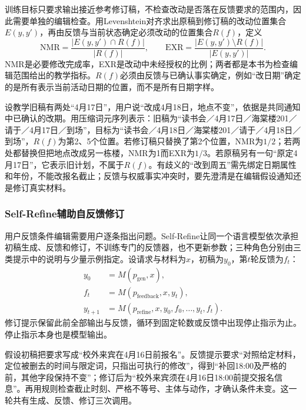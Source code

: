 训练目标只要求输出接近参考修订稿，不检查改动是否落在反馈要求的范围内，因此需要单独的编辑检查。用Levenshtein对齐求出原稿到修订稿的改动位置集合$E(y,y')$，再由反馈与当前状态确定必须改动的位置集合$R(f)$，定义
\begin{equation}
 \mathrm{NMR}=\frac{\lvert E(y,y')\cap R(f)\rvert}{\lvert R(f)\rvert},
 \qquad
 \mathrm{EXR}=\frac{\lvert E(y,y')\setminus R(f)\rvert}{\lvert E(y,y')\rvert}.
 \label{eq:nlp-dialogue-edit-rates}
\end{equation}
NMR是必要修改完成率，EXR是改动中未经授权的比例；两者都是本书为检查编辑范围给出的教学指标。$R(f)$必须由反馈与已确认事实确定，例如“改日期”确定的是所有表示当前活动日期的位置，而不是所有日期字样。

设教学旧稿有两处“4月17日”，用户说“改成4月18日，地点不变”，依据是共同通知中已确认的改期。用压缩词元序列表示：旧稿为“读书会／4月17日／海棠楼201／请于／4月17日／到场”，目标为“读书会／4月18日／海棠楼201／请于／4月18日／到场”，$R(f)$为第2、5个位置。若修订稿只替换了第2个位置，NMR为$1/2$；若两处都替换但把地点改成另一栋楼，NMR为1而EXR为$1/3$。若原稿另有一句“原定4月17日”，它表示旧计划，不属于$R(f)$。有歧义的“改到周五”需先绑定日期属性和年份，不能改报名截止；反馈与权威事实冲突时，要先澄清是在编辑假设通知还是修订真实材料。

\subsubsection{Self-Refine辅助自反馈修订}
\label{sec:nlp-dialogue-self-refine}

用户反馈条件编辑需要用户逐条指出问题。Self-Refine让同一个语言模型依次承担初稿生成、反馈和修订，不训练专门的反馈器，也不更新参数；三种角色分别由三类提示中的说明与少量示例指定。设请求与材料为$x$，初稿为$y_0$，第$t$轮反馈为$f_t$：
\begin{equation}
\begin{aligned}
 y_0&=M(p_{\mathrm{gen}},x),\\
 f_t&=M(p_{\mathrm{feedback}},x,y_t),\\
 y_{t+1}&=M(p_{\mathrm{refine}},x,y_0,f_0,\ldots,y_t,f_t).
\end{aligned}
\label{eq:nlp-dialogue-self-refine}
\end{equation}
修订提示保留此前全部输出与反馈，循环到固定轮数或反馈中出现停止指示为止。停止指示本身也是模型输出。

假设初稿把要求写成“校外来宾在4月16日前报名”。反馈提示要求“对照给定材料，定位被删去的时间与限定词，只指出可执行的修改”，得到“补回18:00及严格的前，其他字段保持不变”；修订后为“校外来宾须在4月16日18:00前提交报名信息”。再用规则检查截止时刻、严格不等号、主体与动作，才确认条件未变。这一轮共有生成、反馈、修订三次调用。

